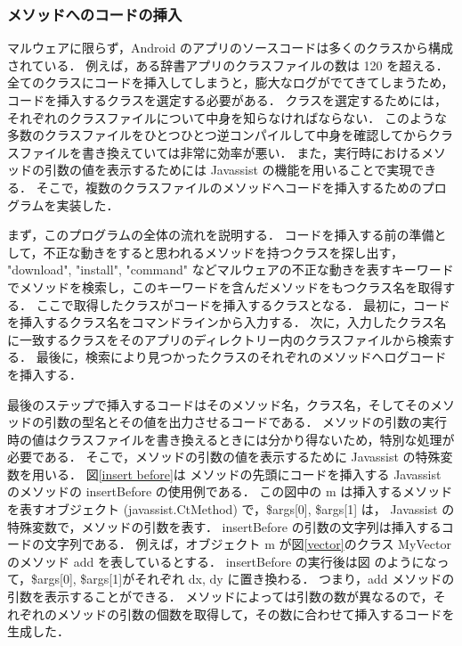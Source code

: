 \subsubsection{メソッドへのコードの挿入}
\label{insertcodes}
マルウェアに限らず，Android のアプリのソースコードは多くのクラスから構成されている．
例えば，ある辞書アプリのクラスファイルの数は 120 を超える．
全てのクラスにコードを挿入してしまうと，膨大なログがでてきてしまうため，コードを挿入するクラスを選定する必要がある．
クラスを選定するためには，それぞれのクラスファイルについて中身を知らなければならない．
このような多数のクラスファイルをひとつひとつ逆コンパイルして中身を確認してからクラスファイルを書き換えていては非常に効率が悪い．
また，実行時におけるメソッドの引数の値を表示するためには Javassist の機能を用いることで実現できる．
そこで，複数のクラスファイルのメソッドへコードを挿入するためのプログラムを実装した．

まず，このプログラムの全体の流れを説明する．
コードを挿入する前の準備として，不正な動きをすると思われるメソッドを持つクラスを探し出す，
"download", "install", "command" などマルウェアの不正な動きを表すキーワードでメソッドを検索し，このキーワードを含んだメソッドをもつクラス名を取得する．
ここで取得したクラスがコードを挿入するクラスとなる．
最初に，コードを挿入するクラス名をコマンドラインから入力する．
次に，入力したクラス名に一致するクラスをそのアプリのディレクトリー内のクラスファイルから検索する．
最後に，検索により見つかったクラスのそれぞれのメソッドへログコードを挿入する．

最後のステップで挿入するコードはそのメソッド名，クラス名，そしてそのメソッドの引数の型名とその値を出力させるコードである．
メソッドの引数の実行時の値はクラスファイルを書き換えるときには分かり得ないため，特別な処理が必要である．
そこで，メソッドの引数の値を表示するために Javassist の特殊変数を用いる．
図\ref{insert before}は メソッドの先頭にコードを挿入する Javassist のメソッドの insertBefore の使用例である．
この図中の m は挿入するメソッドを表すオブジェクト (javassist.CtMethod) で，\$args[0], \$args[1] は， Javassist の特殊変数で，メソッドの引数を表す．
insertBefore の引数の文字列は挿入するコードの文字列である．
例えば，オブジェクト m が図\ref{vector}のクラス MyVector のメソッド add を表しているとする．
insertBefore の実行後は図 のようになって，\$args[0], \$args[1]がそれぞれ dx, dy に置き換わる．
つまり，add メソッドの引数を表示することができる．
メソッドによっては引数の数が異なるので，それぞれのメソッドの引数の個数を取得して，その数に合わせて挿入するコードを生成した．

